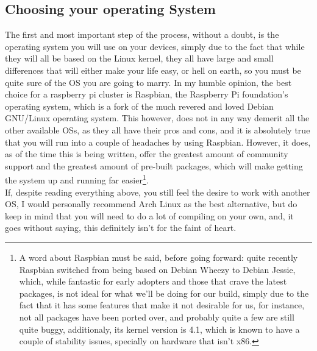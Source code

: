 \documentclass[]{article}
\begin{document}
                    \subsection{Choosing your operating System}
                    The first and most important step of the process, without a doubt, is the operating system you will use on 
                    your devices, simply due to the fact that while they will all be based on the Linux kernel, they all have 
                    large and small differences that will either make your life easy, or hell on earth, so you must be quite 
                    sure of the OS you are going to marry. In my humble opinion, the best choice for a raspberry pi cluster is 
                    Raspbian, the Raspberry Pi foundation's operating system, which is a fork of the much revered and loved 
                    Debian GNU/Linux operating system. This however, does not in any way demerit all the other available OSs, as 
                    they all have their pros and cons, and it is absolutely true that you will run into a couple of headaches by 
                    using Raspbian. However, it does, as of the time this is being written, offer the greatest amount of 
                    community support and the greatest amount of pre-built packages, which will make getting the system up and 
                    running far easier\footnote{A word about Raspbian must be said, before going forward: quite recently
                        Raspbian switched from being based on Debian Wheezy to Debian Jessie, which, while fantastic for early 
                            adopters and those that crave the latest packages, is not ideal for what we'll be doing for our build, 
                                     simply due to the fact that it has some features that make it not desirable for us, for instance, not all 
                                         packages have been ported over, and probably quite a few are still quite buggy, additionaly, its kernel 
                                         version is 4.1, which is known to have a couple of stability issues, specially on hardware that isn't 
                                         x86.}.\\

                                         If, despite reading everything above, you still feel the desire to work with another OS, I would personally 
                                         recommend Arch Linux as the best alternative, but do keep in mind that you will need to do a lot of 
                                         compiling on your own, and, it goes without saying, this definitely isn't for the faint of heart.
\end{document}
